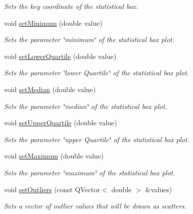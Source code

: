 \begin{DoxyCompactItemize}
\begin{DoxyCompactList}\small\item\em Sets the key coordinate of the statistical box. \end{DoxyCompactList}\item 
void \hyperlink{classQCPStatisticalBox_a84ff7cc61ba44890f0c3e0c99c19941e}{set\+Minimum} (double value)
\begin{DoxyCompactList}\small\item\em Sets the parameter \char`\"{}minimum\char`\"{} of the statistical box plot. \end{DoxyCompactList}\item 
void \hyperlink{classQCPStatisticalBox_a680941af5e23d902013962fa67223f9e}{set\+Lower\+Quartile} (double value)
\begin{DoxyCompactList}\small\item\em Sets the parameter \char`\"{}lower Quartile\char`\"{} of the statistical box plot. \end{DoxyCompactList}\item 
void \hyperlink{classQCPStatisticalBox_a65970e77a897da4ecb4b15300868aad3}{set\+Median} (double value)
\begin{DoxyCompactList}\small\item\em Sets the parameter \char`\"{}median\char`\"{} of the statistical box plot. \end{DoxyCompactList}\item 
void \hyperlink{classQCPStatisticalBox_a65a1375f941c5a2077b5201229e89346}{set\+Upper\+Quartile} (double value)
\begin{DoxyCompactList}\small\item\em Sets the parameter \char`\"{}upper Quartile\char`\"{} of the statistical box plot. \end{DoxyCompactList}\item 
void \hyperlink{classQCPStatisticalBox_acec5ad1901f00f2c5387cfb4d9787eb3}{set\+Maximum} (double value)
\begin{DoxyCompactList}\small\item\em Sets the parameter \char`\"{}maximum\char`\"{} of the statistical box plot. \end{DoxyCompactList}\item 
void \hyperlink{classQCPStatisticalBox_af9bc09620e0bf93bf444ee35e5800d1d}{set\+Outliers} (const Q\+Vector$<$ double $>$ \&values)
\begin{DoxyCompactList}\small\item\em Sets a vector of outlier values that will be drawn as scatters. \end{DoxyCompactList}\item 

\end{DoxyCompactItemize}
